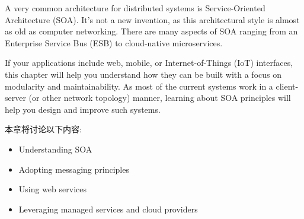 
A very common architecture for distributed systems is Service-Oriented Architecture (SOA). It's not a new invention, as this architectural style is almost as old as computer networking. There are many aspects of SOA ranging from an Enterprise Service Bus (ESB) to cloud-native microservices.

If your applications include web, mobile, or Internet-of-Things (IoT) interfaces, this chapter will help you understand how they can be built with a focus on modularity and maintainability. As most of the current systems work in a client-server (or other network topology) manner, learning about SOA principles will help you design and improve such systems.

本章将讨论以下内容:

\begin{itemize}
\item 
Understanding SOA

\item 
Adopting messaging principles

\item 
Using web services

\item 
Leveraging managed services and cloud providers 
\end{itemize}